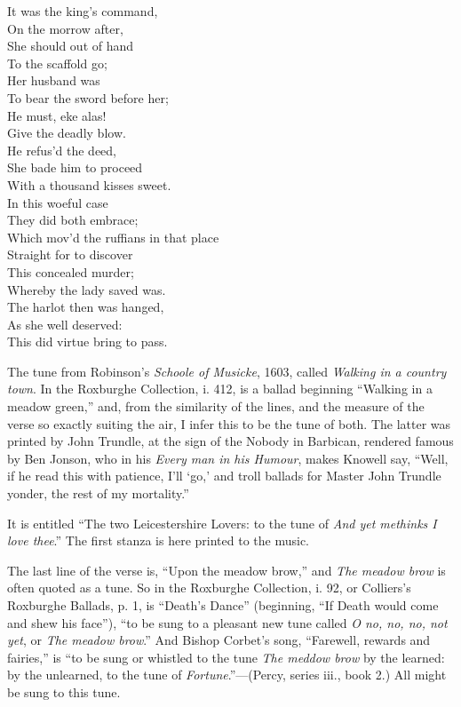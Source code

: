 \begin{dcverse}
\begin{patverse}
It was the king’s command,\\
On the morrow after,\\
She should out of hand\\
To the scaffold go;\\
Her husband was\\
To bear the sword before her;\\
He must, eke alas!\\
Give the deadly blow.\\
He refus’d the deed,\\
She bade him to proceed\\
With a thousand kisses sweet.\\
In this woeful case\\
They did both embrace;\\
Which mov’d the ruffians in that place\\
Straight for to discover\\
This concealed murder;\\
Whereby the lady saved was.\\
The harlot then was hanged,\\
As she well deserved:\\
This did virtue bring to pass.
\end{patverse}

\end{dcverse}

\pagebreak


The tune from Robinson’s \textit{Schoole of Musicke}, 1603, called \textit{Walking in a
country town}. In the Roxburghe Collection, i. 412, is a ballad beginning
“Walking in a meadow green,” and, from the similarity of the lines, and the
measure of the verse so exactly suiting the air, I infer this to be the tune of both.
The latter was printed by John Trundle, at the sign of the Nobody in Barbican,
rendered famous by Ben Jonson, who in his \textit{Every man in his Humour}, makes
Knowell say, “Well, if he read this with patience, I’ll ‘go,’ and troll ballads for
Master John Trundle yonder, the rest of my mortality.”

It is entitled “The two Leicestershire Lovers: to the tune of \textit{And yet methinks
I love thee}.” The first stanza is here printed to the music.

The last line of the verse is, “Upon the meadow brow,” and \textit{The meadow brow}
is often quoted as a tune. So in the Roxburghe Collection, i. 92, or Colliers’s
Roxburghe Ballads, p. 1, is “Death’s Dance” (beginning, “If Death would come
and shew his face”), “to be sung to a pleasant new tune called \textit{O no, no, no, not
yet}, or \textit{The meadow brow}.” And Bishop Corbet’s song, “Farewell, rewards and
fairies,” is “to be sung or whistled to the tune \textit{The meddow brow} by the learned:
by the unlearned, to the tune of \textit{Fortune}.”—(Percy, series iii., book 2.) All
might be sung to this tune.

